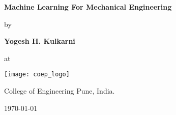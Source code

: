\begin{center}
{\Huge{\textbf{Machine Learning For Mechanical Engineering}}}

\vspace{.25in}

by

\vspace{.25in}

{\large{\textbf{Yogesh H. Kulkarni}}}

\vspace{4.5in}


at
\vspace{.2in}

\texttt{[image: coep\_logo]}

College of Engineering Pune, India.

\vspace{.5in}
\today
\end{center}
